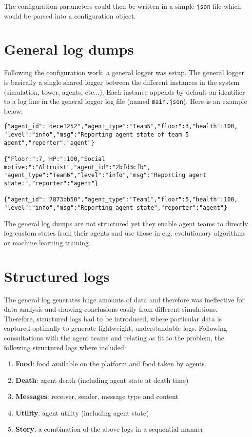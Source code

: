 The configuration parameters could then be written in a simple \texttt{json} file which would be parsed into a configuration object.

\section{General log dumps}

Following the configuration work, a general logger was setup. The general logger is basically a single shared logger between the different instances in the system (simulation, tower, agents, etc...). Each instance appends by default an identifier to a log line in the general logger log file (named \texttt{main.json}). Here is an example below:

\begin{verbatim}
{"agent_id":"dece1252","agent_type":"Team5","floor":3,"health":100,
"level":"info","msg":"Reporting agent state of team 5 agent","reporter":"agent"}

{"Floor:":7,"HP:":100,"Social motive:":"Altruist","agent_id":"2bfd3cfb",
"agent_type":"Team6","level":"info","msg":"Reporting agent state:","reporter":"agent"}

{"agent_id":"7873bb50","agent_type":"Team1","floor":5,"health":100,
"level":"info","msg":"Reporting agent state","reporter":"agent"}
\end{verbatim}

The general log dumps are not structured yet they enable agent teams to directly log custom states from their agents and use those in e.g. evolutionary algorithms or machine learning training.

\section{Structured logs}

The general log generates huge amounts of data and therefore was ineffective for data analysis and drawing conclusions easily from different simulations. Therefore, structured logs had to be introduced, where particular data is captured optimally to generate lightweight, understandable logs. Following consultations with the agent teams and relating as fit to the problem, the following structured logs where included:

\begin{enumerate}
    \item \textbf{Food}: food available on the platform and food taken by agents.
    \item \textbf{Death}: agent death (including agent state at death time)
    \item \textbf{Messages}: receiver, sender, message type and content
    \item \textbf{Utility}: agent utility (including agent state)
    \item \textbf{Story}: a combination of the above logs in a sequential manner
\end{enumerate}

